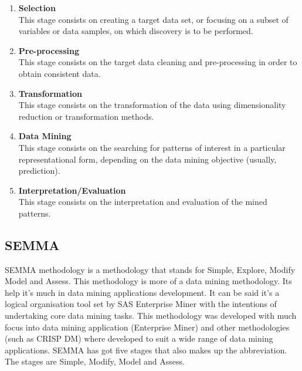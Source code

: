 \documentclass[12pt]{report}
\begin{document}
	\begin{enumerate}
		\item \textbf{Selection }\\
		This stage consists on creating a target data set, or focusing on a subset of variables or data samples, on which discovery is to be performed.\\
		
		\item \textbf{Pre-processing }\\
		This stage consists on the target data cleaning and pre-processing in order to obtain consistent data.\\
		
		\item \textbf{Transformation }\\
		This stage consists on the transformation of the data using dimensionality reduction or transformation methods.\\
		
		\item \textbf{Data Mining}\\
		This stage consists on the searching for patterns of interest in a particular representational form, depending on the data mining objective (usually, prediction).\\
		
		\item \textbf{Interpretation/Evaluation} \\
		This stage consists on the interpretation and evaluation of the mined patterns.\\
		
	\end{enumerate}
	\subsection{SEMMA}
	SEMMA methodology is a methodology that stands for Simple, Explore, Modify Model and Assess. This methodology is more of a data mining methodology. Its help it’s much in data mining applications development. It can be said it’s a logical organisation tool set by SAS Enterprise Miner with the intentions of undertaking core data mining tasks. This methodology was developed with much focus into data mining application (Enterprise Miner) and other methodologies (such as CRISP DM) where developed to suit a wide range of data mining applications. SEMMA has got five stages that also makes up the abbreviation. The stages are Simple, Modify, Model and Assess.\\
	
\end{document}
